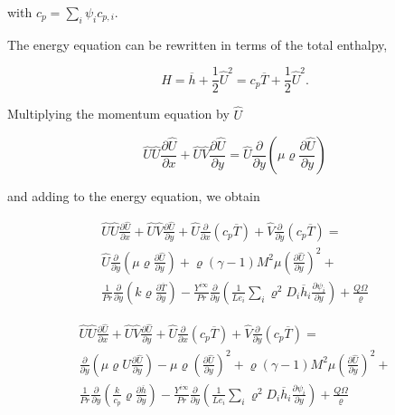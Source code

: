 with $c_p=\sum_i \psi_i c_{p,i}$.

The energy equation can be rewritten in terms of the total enthalpy, 

\begin{equation}
H=\overline{h}+\frac{1}{2}\hat{U}^2
=c_p \overline{T}+\frac{1}{2}\hat{U}^2. 
\end{equation}

Multiplying the momentum equation by $\hat{U}$ 

\begin{equation} 
\hat{U}
 \hat{U}\frac{\partial \hat{U}}{\partial x}
 +
\hat{U}
 \hat{V}\frac{\partial \hat{U}}{\partial y}
 =
\hat{U}
\frac{\partial}{\partial y}\left(\mu\varrho\frac{\partial \hat{U}}{\partial  y}\right)
\end{equation} 

and adding to the energy
equation, we obtain

\begin{equation} 
\begin{split}
\hat{U}
 \hat{U}\frac{\partial \hat{U}}{\partial x}
 +
\hat{U}
 \hat{V}\frac{\partial \hat{U}}{\partial y}
+
\hat{U}\frac{\partial }{\partial x}(c_p \overline{T})
+
\hat{V}
\frac{\partial }{\partial y}(c_p \overline{T})
 =
 \\
\hat{U}
\frac{\partial}{\partial y}\left(\mu\varrho\frac{\partial \hat{U}}{\partial  y}\right)
+
\varrho
(\gamma-1)M^2\mu
\left(
\frac{\partial \hat{U}}{\partial y}
\right)
^2
+
\\
\frac{1}{Pr}\frac{\partial}{\partial y}\left(k\varrho\frac{\partial \overline{T}}{\partial y}\right)
-
\frac{Y^{i\infty}}{Pr}
\frac{\partial}{\partial y}
       \left(
              \frac{1}{Le_i}
              \sum_i\varrho^2 D_i\overline{h}_i\frac{\partial \psi_i}{\partial y}
       \right)
+
\frac{Q\Omega}{\varrho}
\end{split}
\end{equation}       

\begin{equation} 
\begin{split}
\hat{U}
 \hat{U}\frac{\partial \hat{U}}{\partial x}
 +
\hat{U}
 \hat{V}\frac{\partial \hat{U}}{\partial y}
+
\hat{U}\frac{\partial }{\partial x}(c_p \overline{T})
+
\hat{V}
\frac{\partial }{\partial y}(c_p \overline{T})
 =
 \\
\frac{\partial}{\partial y}\left(\mu \varrho\hat{U}\frac{\partial \hat{U}}{\partial  y}\right)
-
\mu 
\varrho
\left(
\frac{\partial \hat{U}}{\partial y}
\right)
^2
+
\varrho
(\gamma-1)M^2\mu
\left(
\frac{\partial \hat{U}}{\partial y}
\right)
^2
+
\\
\frac{1}{Pr}\frac{\partial}{\partial y}
\left(\frac{k}{c_p}\varrho\frac{\partial \overline{h}}{\partial y}\right)
-
\frac{Y^{i\infty}}{Pr}
\frac{\partial}{\partial y}
       \left(
              \frac{1}{Le_i}
              \sum_i\varrho^2 D_i\overline{h}_i\frac{\partial \psi_i}{\partial y}
       \right)
+
\frac{Q\Omega}{\varrho}
\end{split}
\end{equation}       

